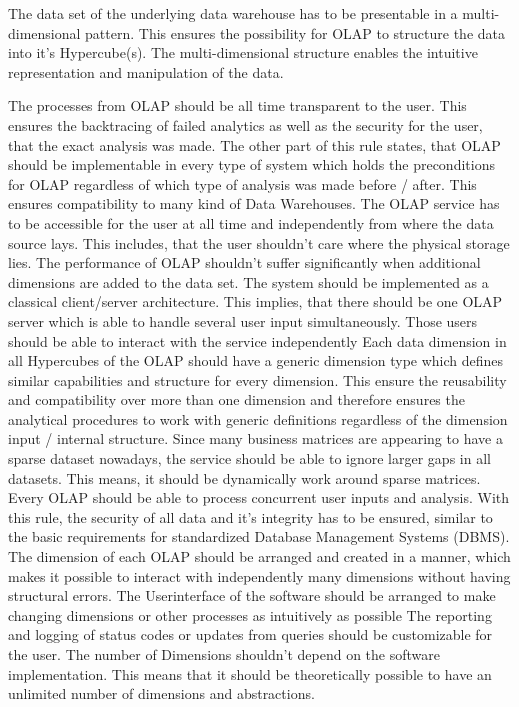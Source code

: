\documentclass[12pt,a4paper,oneside,
liststotoc, 					%
bibtotoc,						%
titlepage, 						%
headsepline, 					%
BCOR6mm,						%
openany,							%
]{scrreprt}
\begin{document}
The data set of the underlying data warehouse has to be presentable in a multi-dimensional pattern. This ensures the possibility for OLAP to structure the data into it's Hypercube(s). The multi-dimensional structure enables the intuitive representation and manipulation of the data.

The processes from OLAP should be all time transparent to the user. This ensures the backtracing of failed analytics as well as the security for the user, that the exact analysis was made. The other part of this rule states, that OLAP should be implementable in every type of system which holds the preconditions for OLAP regardless of which type of analysis was made before / after. This ensures compatibility to many kind of Data Warehouses.
The OLAP service has to be accessible for the user at all time and independently from where the data source lays. This includes, that the user shouldn't care where the physical storage lies.
The performance of OLAP shouldn't suffer significantly when additional dimensions are added to the data set.
The system should be implemented as a classical client/server architecture. This implies, that there should be one OLAP server which is able to handle several user input simultaneously. Those users should be able to interact with the service independently
Each data dimension in all Hypercubes of the OLAP should have a generic dimension type which defines similar capabilities and structure for every dimension. This ensure the reusability and compatibility over more than one dimension and therefore ensures the analytical procedures to work with generic definitions regardless of the dimension input / internal structure.
Since many business matrices are appearing to have a sparse dataset nowadays, the service should be able to ignore larger gaps in all datasets. This means, it should be dynamically work around sparse matrices.
Every OLAP should be able to process concurrent user inputs and analysis. With this rule, the security of all data and it's integrity has to be ensured, similar to the basic requirements for standardized Database Management Systems (DBMS).
The dimension of each OLAP should be arranged and created in a manner, which makes it possible to interact with independently many dimensions without having structural errors.
The Userinterface of the software should be arranged to make changing dimensions or other processes as intuitively as possible
The reporting and logging of status codes or updates from queries should be customizable for the user.
The number of Dimensions shouldn't depend on the software implementation. This means that it should be theoretically possible to have an unlimited number of dimensions and abstractions.
\end{document}
